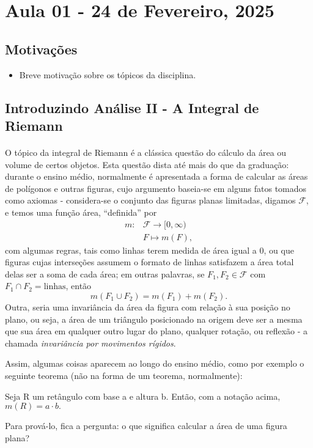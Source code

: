 \documentclass[../analysisII_notes.tex]{subfiles}
\begin{document}
\section{Aula 01 - 24 de Fevereiro, 2025}
\subsection{Motivações}
\begin{itemize}
	\item Breve motivação sobre os tópicos da disciplina.
\end{itemize}
\subsection{Introduzindo Análise II - A Integral de Riemann}
\paragraph{} O tópico da integral de Riemann é a clássica questão do cálculo da área ou volume de certos objetos. Esta questão dista até mais do que da graduação: durante o ensino médio, normalmente é apresentada  a forma de calcular as áreas de polígonos e outras figuras, cujo argumento baseia-se em alguns fatos tomados como axiomas - considera-se o conjunto das figuras planas limitadas, digamos \(\mathcal{F}\), e temos uma função área, ``definida'' por
\begin{align*}
	m: & \mathcal{F}\rightarrow [0, \infty) \\
	   & F\mapsto m(F),
\end{align*}
com algumas regras, tais como linhas terem medida de área igual a 0, ou que figuras cujas interseções assumem o formato de linhas satisfazem a área total delas ser a soma de cada área; em outras palavras, se \(F_{1}, F_{2}\in \mathcal{F}\) com \(F_{1}\cap F_{2} = \text{linhas}\), então
\[
	m(F_{1}\cup F_{2}) = m(F_{1}) + m(F_{2}).
\]
Outra, seria uma invariância da área da figura com relação à sua posição no plano, ou seja, a área de um triângulo posicionado na origem deve ser a mesma que sua área em qualquer outro lugar do plano, qualquer rotação, ou reflexão - a chamada \textit{invariância por movimentos rígidos}.

Assim, algumas coisas aparecem ao longo do ensino médio, como por exemplo o seguinte teorema (não na forma de um teorema, normalmente):
\begin{theorem*}
	Seja R um retângulo com base a e altura b. Então, com a notação acima, \(m(R) = a \cdot b.\)
\end{theorem*}
Para prová-lo, fica a pergunta: o que significa calcular a área de uma figura plana?
\end{document}
